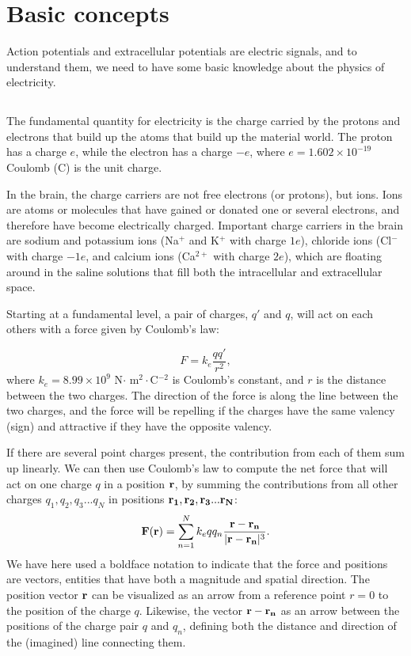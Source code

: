 \section{Basic concepts} 
\label{sec:Basics}
Action potentials and extracellular potentials are electric signals, and to understand them, we need to have some basic knowledge about the physics of electricity. 


\subsection{}
The fundamental quantity for electricity is the charge carried by the protons and electrons that build up the atoms that build up the material world. The proton has a charge $e$, while the electron has a charge $-e$, where $e = 1.602\times10^{-19}$ Coulomb (C) is the unit charge. 

In the brain, the charge carriers are not free electrons (or protons), but ions. Ions are atoms or molecules that have gained or donated one or several electrons, and therefore have become electrically charged. Important charge carriers in the brain are sodium and potassium ions (Na$^+$ and K$^+$ with charge $1e$), chloride ions (Cl$^-$ with charge $-1e$, and calcium ions (Ca$^{2+}$ with charge $2e$), which are floating around in the saline solutions that fill both the intracellular and extracellular space.

Starting at a fundamental level, a pair of charges, $q'$ and $q$, will act on each others with a force given by Coulomb's law:

\begin{equation}
F = k_e\frac{q q'}{r^2}, 
\label{Basics:eq:CoulombF}
\end{equation}
where $k_e = 8.99\times10^9$ N$\cdot$ m$^2\cdot$C$^{-2}$ is Coulomb's constant, and $r$ is the distance between the two charges. The direction of the force is along the line between the two charges, and the force will be repelling if the charges have the same valency (sign) and attractive if they have the opposite valency. 

If there are several point charges present, the contribution from each of them sum up linearly. We can then use Coulomb's law to compute the net force that will act on one charge $q$ in a position ${\bf r}$, by summing the contributions from all other charges $q_1, q_2, q_3 ... q_N$ in positions ${\bf r_1}, {\bf r_2}, {\bf r_3} ... {\bf r_N}$: 
\begin{equation}
{\bf F}({\bf r}) = \sum_{n=1}^N k_e q q_n \frac{{\bf r}-{\bf r_n}}{|{\bf r}-{\bf r_n}|^3}.
\label{Basics:eq:CoulombFN}
\end{equation}
We have here used a boldface notation to indicate that the force and positions are vectors, entities that have both a magnitude and spatial direction. The position vector ${\bf r}$ can be visualized as an arrow from a reference point $r=0$ to the position of the charge $q$. Likewise, the vector ${\bf r}-{\bf r_n}$ as an arrow between the positions of the charge pair $q$ and $q_n$, defining both the distance and direction of the (imagined) line connecting them.

